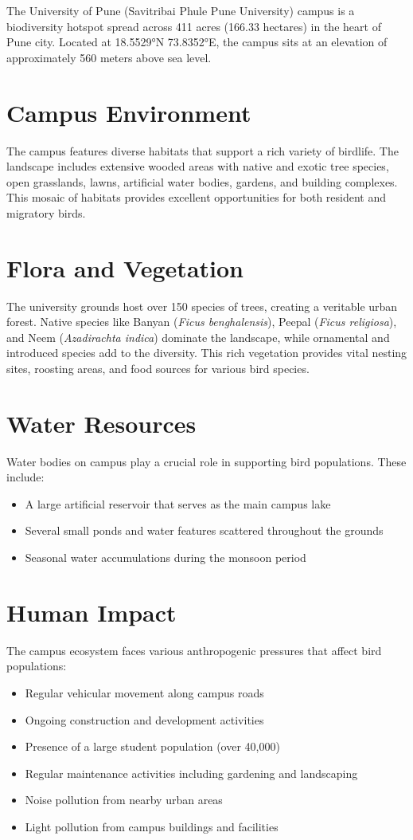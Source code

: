 \documentclass[a4paper,12pt,landscape]{memoir}
\newcommand{\introsection}[2]{%
  \begin{minipage}[t]{0.48\textwidth}
    \begin{mdframed}[
      linecolor=headingcolor,
      linewidth=1pt,
      roundcorner=5pt,
      leftmargin=0pt,
      rightmargin=0pt,
      backgroundcolor=headingcolor!5
    ]
      #1
    \end{mdframed}
  \end{minipage}\hfill
  \begin{minipage}[t]{0.48\textwidth}
    \begin{mdframed}[
      linecolor=headingcolor,
      linewidth=1pt,
      roundcorner=5pt,
      leftmargin=0pt,
      rightmargin=0pt,
      backgroundcolor=headingcolor!5
    ]
      #2
    \end{mdframed}
  \end{minipage}
  \newpage
}
\begin{document}
\introsection{%
  The University of Pune (Savitribai Phule Pune University) campus is a biodiversity hotspot spread across 411 acres (166.33 hectares) in the heart of Pune city. Located at 18.5529°N 73.8352°E, the campus sits at an elevation of approximately 560 meters above sea level.

  \section*{Campus Environment}
  The campus features diverse habitats that support a rich variety of birdlife. The landscape includes extensive wooded areas with native and exotic tree species, open grasslands, lawns, artificial water bodies, gardens, and building complexes. This mosaic of habitats provides excellent opportunities for both resident and migratory birds.

  \section*{Flora and Vegetation}
  The university grounds host over 150 species of trees, creating a veritable urban forest. Native species like Banyan (\textit{Ficus benghalensis}), Peepal (\textit{Ficus religiosa}), and Neem (\textit{Azadirachta indica}) dominate the landscape, while ornamental and introduced species add to the diversity. This rich vegetation provides vital nesting sites, roosting areas, and food sources for various bird species.
}{%
  \section*{Water Resources}
  Water bodies on campus play a crucial role in supporting bird populations. These include:
  \begin{itemize}
  \item A large artificial reservoir that serves as the main campus lake
  \item Several small ponds and water features scattered throughout the grounds
  \item Seasonal water accumulations during the monsoon period
  \end{itemize}

  \section*{Human Impact}
  The campus ecosystem faces various anthropogenic pressures that affect bird populations:
  \begin{itemize}
  \item Regular vehicular movement along campus roads
  \item Ongoing construction and development activities
  \item Presence of a large student population (over 40,000)
  \item Regular maintenance activities including gardening and landscaping
  \item Noise pollution from nearby urban areas
  \item Light pollution from campus buildings and facilities
  \end{itemize}
}
\end{document}
